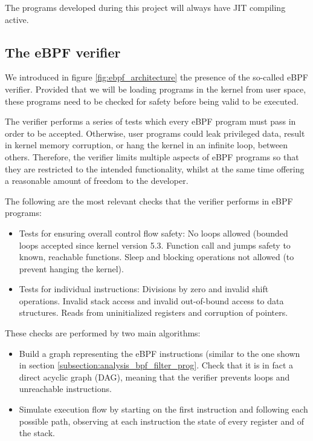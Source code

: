 \documentclass[12pt]{report} %
\begin{document}
The programs developed during this project will always have JIT compiling active.


\subsection{The eBPF verifier} \label{subsection:ebpf_verifier}
We introduced in figure \ref{fig:ebpf_architecture} the presence of the so-called eBPF verifier. Provided that we will be loading programs in the kernel from user space, these programs need to be checked for safety before being valid to be executed.

The verifier performs a series of tests which every eBPF program must pass in order to be accepted. Otherwise, user programs could leak privileged data, result in kernel memory corruption, or hang the kernel in an infinite loop, between others. Therefore, the verifier limits multiple aspects of eBPF programs so that they are restricted to the intended functionality, whilst at the same time offering a reasonable amount of freedom to the developer.

The following are the most relevant checks that the verifier performs in eBPF programs\cite{ebpf_verifier_kerneldocs}\cite{ebpf_JIT_demystify_page17-22}:
\begin{itemize}
\item Tests for ensuring overall control flow safety:
	\subitem No loops allowed (bounded loops accepted since kernel version 5.3\cite{ebpf_bounded_loops}.
	\subitem Function call and jumps safety to known, reachable functions.
	\subitem Sleep and blocking operations not allowed (to prevent hanging the kernel).
\item Tests for individual instructions:
	 \subitem Divisions by zero and invalid shift operations.
	 \subitem Invalid stack access and invalid out-of-bound access to data structures.
	 \subitem Reads from uninitialized registers and corruption of pointers.
\end{itemize}

These checks are performed by two main algorithms:
\begin{itemize}
\item Build a graph representing the eBPF instructions (similar to the one shown in section \ref{subsection:analysis_bpf_filter_prog}. Check that it is in fact a direct acyclic graph (DAG), meaning that the verifier prevents loops and unreachable instructions.
\item Simulate execution flow by starting on the first instruction and following each possible path, observing at each instruction the state of every register and of the stack.
\end{itemize}
\end{document}
